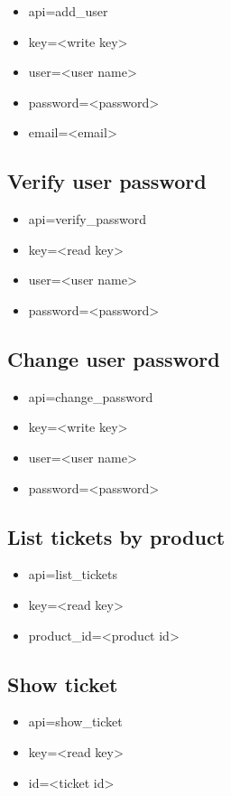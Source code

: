 \documentclass[11pt]{article}
\begin{document}
\begin{itemize}
\item api=add\_user
\item key=<write key>
\item user=<user name>
\item password=<password>
\item email=<email>
\end{itemize}

\subsection{Verify user password}

\begin{itemize}
\item api=verify\_password
\item key=<read key>
\item user=<user name>
\item password=<password>
\end{itemize}

\subsection{Change user password}

\begin{itemize}
\item api=change\_password
\item key=<write key>
\item user=<user name>
\item password=<password>
\end{itemize}

\subsection{List tickets by product}

\begin{itemize}
\item api=list\_tickets
\item key=<read key>
\item product\_id=<product id>
\end{itemize}

\subsection{Show ticket}

\begin{itemize}
\item api=show\_ticket
\item key=<read key>
\item id=<ticket id>
\end{itemize}
\end{document}
